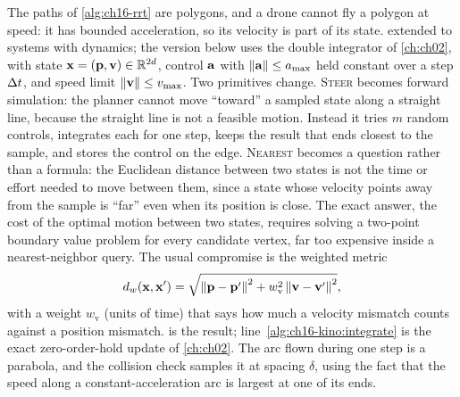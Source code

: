 The paths of \cref{alg:ch16-rrt} are polygons, and a drone cannot fly a
polygon at speed: it has bounded acceleration, so its velocity is part of its
state. \textcite{lavalle2001randomized} extended \rrt to systems with
dynamics; the version below uses the double integrator of \cref{ch:ch02},
with state $\mathbf{x}=(\mathbf{p},\mathbf{v})\in\mathbb{R}^{2d}$, control $\mathbf{a}$ with
$\left\lVert \mathbf{a} \right\rVert\le a_{\max}$ held constant over a step $\Delta t$, and speed limit
$\left\lVert \mathbf{v} \right\rVert\le v_{\max}$.
Two primitives change. \textsc{Steer} becomes forward simulation: the
planner cannot move ``toward'' a sampled state along a straight line,
because the straight line is not a feasible motion. Instead it tries $m$
random controls, integrates each for one step, keeps the result that ends
closest to the sample, and stores the control on the edge. \textsc{Nearest}
becomes a question rather than a formula: the Euclidean distance between two
states is not the time or effort needed to move between them, since a state
whose velocity points away from the sample is ``far'' even when its position
is close. The exact answer, the cost of the optimal motion between two
states, requires solving a two-point boundary value problem for every
candidate vertex, far too expensive inside a nearest-neighbor query. The
usual compromise is the weighted metric
\begin{equation}
d_{w}(\mathbf{x},\mathbf{x}')=\sqrt{\left\lVert \mathbf{p}-\mathbf{p}' \right\rVert^{2}+w_{\mathrm{v}}^{2}\left\lVert \mathbf{v}-\mathbf{v}' \right\rVert^{2}},
\label{eq:ch16-metric}
\end{equation}
with a weight $w_{\mathrm{v}}$ (units of time) that says how much a velocity
mismatch counts against a position mismatch.  is the
result; line~\ref{alg:ch16-kino:integrate} is the exact zero-order-hold
update of \cref{ch:ch02}. The arc flown during one step is a parabola, and
the collision check samples it at spacing $\delta$, using the fact that the
speed along a constant-acceleration arc is largest at one of its ends.

